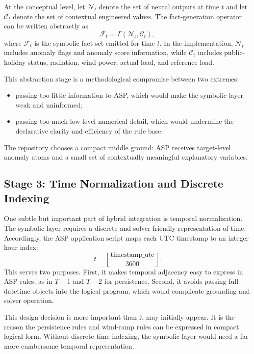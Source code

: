At the conceptual level, let $\mathcal{N}_t$ denote the set of neural outputs at time $t$ and let $\mathcal{C}_t$ denote the set of contextual engineered values. The fact-generation operator can be written abstractly as
\begin{equation}
	\mathcal{F}_t = \Gamma(\mathcal{N}_t,\mathcal{C}_t),
	\label{eq:fact_operator}
\end{equation}
where $\mathcal{F}_t$ is the symbolic fact set emitted for time $t$. In the implementation, $\mathcal{N}_t$ includes anomaly flags and anomaly score information, while $\mathcal{C}_t$ includes public-holiday status, radiation, wind power, actual load, and reference load.

This abstraction stage is a methodological compromise between two extremes:
\begin{itemize}
	\item passing too little information to ASP, which would make the symbolic layer weak and uninformed;
	\item passing too much low-level numerical detail, which would undermine the declarative clarity and efficiency of the rule base.
\end{itemize}
The repository chooses a compact middle ground: ASP receives target-level anomaly atoms and a small set of contextually meaningful explanatory variables.

\subsection{Stage 3: Time Normalization and Discrete Indexing}

One subtle but important part of hybrid integration is temporal normalization. The symbolic layer requires a discrete and solver-friendly representation of time. Accordingly, the ASP application script maps each UTC timestamp to an integer hour index:
\begin{equation}
	t = \left\lfloor \frac{\mathrm{timestamp\_utc}}{3600} \right\rfloor.
	\label{eq:hour_index_ch44}
\end{equation}
This serves two purposes. First, it makes temporal adjacency easy to express in ASP rules, as in $T-1$ and $T-2$ for persistence. Second, it avoids passing full datetime objects into the logical program, which would complicate grounding and solver operation.

This design decision is more important than it may initially appear. It is the reason the persistence rules and wind-ramp rules can be expressed in compact logical form. Without discrete time indexing, the symbolic layer would need a far more cumbersome temporal representation.

